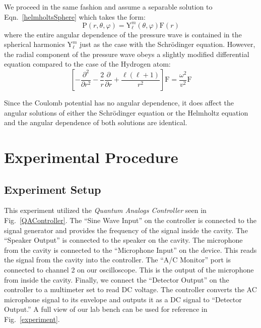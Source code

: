 \documentclass[12pt]{article}
\newcommand{\ppd}[1]{\frac{\partial}{\partial#1}}
\newcommand{\ppsd}[1]{\frac{\partial^2}{\partial #1^2}}
\newcommand{\figref}[1]{Fig.\ \ref{#1}}
\let\originaleqref=\eqref
\renewcommand{\eqref}{Eqn.\ \originaleqref}
\begin{document}
We proceed in the same fashion and assume a separable solution to \eqref{helmholtsSphere} which takes the form:
\begin{equation}
	\mathrm{P}(r,\theta,\varphi) = \mathrm{Y}_\ell^m(\theta,\varphi) \mathrm{F}(r)
\end{equation}
where the entire angular dependence of the pressure wave is contained in the spherical harmonics $\mathrm{Y}_\ell^m$ just as the case with the Schr\"odinger equation. However, the radial component of the pressure wave obeys a slightly modified differential equation compared to the case of the Hydrogen atom:
\begin{equation}
	\left[ -\ppsd{r} - \frac{2}{r}\ppd{r} + \frac{\ell(\ell+1)}{r^2} \right] \mathrm{F} = \frac{\omega^2}{v^2}\mathrm{F}
\end{equation}
	
Since the Coulomb potential has no angular dependence, it does affect the angular solutions of  either the Schr\"odinger equation or the Helmholtz equation and the angular dependence of both solutions are identical. 

	
\section{Experimental Procedure}

	\subsection{Experiment Setup}
	This experiment utilized the \emph{Quantum Analogs Controller} seen in \figref{QAController}. The ``Sine Wave Input'' on the controller is connected to the signal generator and provides the frequency of the signal inside the cavity. The ``Speaker Output'' is connected to the speaker on the cavity. The microphone from the cavity is connected to the ``Microphone Input'' on the device. This reads the signal from the cavity into the controller. The ``A/C Monitor'' port is connected to channel 2 on our oscilloscope. This is the output of the microphone from inside the cavity. Finally, we connect the ``Detector Output'' on the controller to a multimeter set to read DC voltage. The controller converts the AC microphone signal to its envelope and outputs it as a DC signal to ``Detector Output.'' A full view of our lab bench can be used for reference in \figref{experiment}.
	
	
\end{document}

